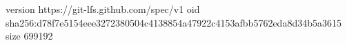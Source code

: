 version https://git-lfs.github.com/spec/v1
oid sha256:d78f7e5154eee3272380504c4138854a47922c4153afbb5762eda8d34b5a3615
size 699192
